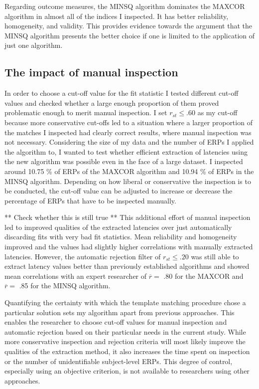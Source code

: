 \documentclass[
  man]{apa7}
\begin{document}
Regarding outcome measures, the MINSQ algorithm dominates the MAXCOR algorithm in almost all of the indices I inspected. It has better reliability, homogeneity, and validity. This provides evidence towards the argument that the MINSQ algorithm presents the better choice if one is limited to the application of just one algorithm.

\hypertarget{the-impact-of-manual-inspection}{%
\subsection{The impact of manual inspection}\label{the-impact-of-manual-inspection}}

In order to choose a cut-off value for the fit statistic I tested different cut-off values and checked whether a large enough proportion of them proved problematic enough to merit manual inspection. I set \(r_{st} \le .60\) as my cut-off because more conservative cut-offs led to a situation where a larger proportion of the matches I inspected had clearly correct results, where manual inspection was not necessary. Considering the size of my data and the number of ERPs I applied the algorithm to, I wanted to test whether efficient extraction of latencies using the new algorithm was possible even in the face of a large dataset. I inspected around 10.75 \% of ERPs of the MAXCOR algorithm and 10.94 \% of ERPs in the MINSQ algorithm. Depending on how liberal or conservative the inspection is to be conducted, the cut-off value can be adjusted to increase or decrease the percentage of ERPs that have to be inspected manually.

** Check whether this is still true **
This additional effort of manual inspection led to improved qualities of the extracted latencies over just automatically discarding fits with very bad fit statistics. Mean reliability and homogeneity improved and the values had slightly higher correlations with manually extracted latencies. However, the automatic rejection filter of \(r_{st} \le .20\) was still able to extract latency values better than previously established algorithms and showed mean correlations with an expert researcher of \(\overline{r} =\) .80 for the MAXCOR and \(\overline{r} =\) .85 for the MINSQ algorithm.

Quantifying the certainty with which the template matching procedure chose a particular solution sets my algorithm apart from previous approaches. This enables the researcher to choose cut-off values for manual inspection and automatic rejection based on their particular needs in the current study. While more conservative inspection and rejection criteria will most likely improve the qualities of the extraction method, it also increases the time spent on inspection or the number of unidentifiable subject-level ERPs. This degree of control, especially using an objective criterion, is not available to researchers using other approaches.
\end{document}
